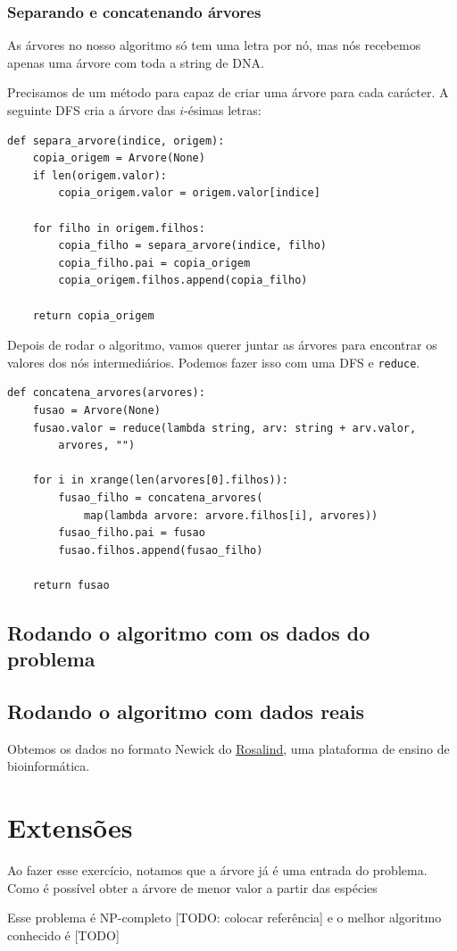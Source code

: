 \documentclass[11pt]{article}
\begin{document}
\subsubsection{Separando e concatenando árvores}
\label{sec-3-1-2}

As árvores no nosso algoritmo só tem uma letra por nó, mas nós
recebemos apenas uma árvore com toda a string de DNA.

Precisamos de um método para capaz de criar uma árvore para cada
carácter. A seguinte DFS cria a árvore das $i$-ésimas letras:
\begin{verbatim}
def separa_arvore(indice, origem):
    copia_origem = Arvore(None)
    if len(origem.valor):
        copia_origem.valor = origem.valor[indice]

    for filho in origem.filhos:
        copia_filho = separa_arvore(indice, filho)
        copia_filho.pai = copia_origem
        copia_origem.filhos.append(copia_filho)

    return copia_origem
\end{verbatim}

Depois de rodar o algoritmo, vamos querer juntar as árvores para encontrar
os valores dos nós intermediários. Podemos fazer isso com uma DFS e \verb~reduce~.
\begin{verbatim}
def concatena_arvores(arvores):
    fusao = Arvore(None)
    fusao.valor = reduce(lambda string, arv: string + arv.valor,
        arvores, "")

    for i in xrange(len(arvores[0].filhos)):
        fusao_filho = concatena_arvores(
            map(lambda arvore: arvore.filhos[i], arvores))
        fusao_filho.pai = fusao
        fusao.filhos.append(fusao_filho)

    return fusao
\end{verbatim}

\subsection{Rodando o algoritmo com os dados do problema}
\label{sec-3-2}

\subsection{Rodando o algoritmo com dados reais}
\label{sec-3-3}

Obtemos os dados no formato Newick do \href{http://rosalind.info}{Rosalind}, uma plataforma de
ensino de bioinformática.

\section{Extensões}
\label{sec-4}

Ao fazer esse exercício, notamos que a árvore já é uma entrada do problema.
Como é possível obter a árvore de menor valor a partir das espécies

Esse problema é NP-completo [TODO: colocar referência] e o melhor
algoritmo conhecido é [TODO]
\end{document}
